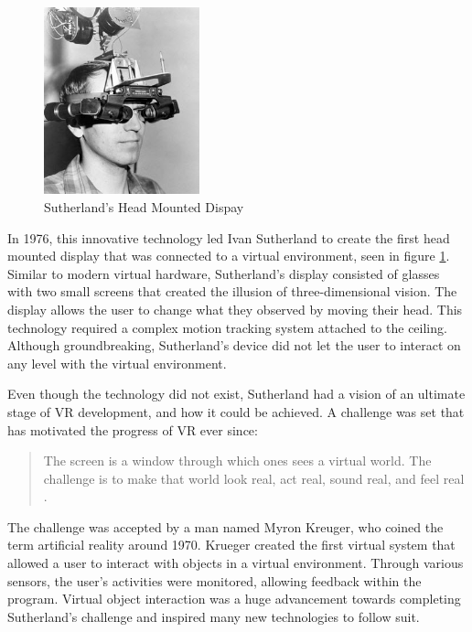 \documentclass[12pt]{article}
\begin{document}
   \begin{figure}[h]
         \centering
    \includegraphics[width=0.4\textwidth]{photo1_sutehrland}
    \caption{Sutherland's Head Mounted Dispay \cite{photo1_sutehrland}}
    \label{fig:sutherland_Display}
 \end{figure} 
 \par In 1976, this innovative technology led Ivan Sutherland to create the first head mounted display that was connected to a virtual environment, seen in figure \ref{fig:sutherland_Display}. Similar to modern virtual hardware, Sutherland's display consisted of glasses with two small screens that created the illusion of three-dimensional vision. The display allows the user to change what they observed by moving their head. This technology required a complex motion tracking system attached to the ceiling. Although groundbreaking, Sutherland's device did not let the user to interact on any level with the virtual environment.

  \par Even though the technology did not exist, Sutherland had a vision of an ultimate stage of VR development, and how it could be achieved. A challenge was set that has motivated the progress of VR ever since: 
  
 \begin{quote}
The screen is a window through which ones sees a virtual world. The challenge is to make that world look real, act real, sound real, and feel real  \cite{gobbetti}. 
\end{quote}

The challenge was accepted by a man named Myron Kreuger, who coined the term artificial reality around 1970. Krueger created the first virtual system that allowed a user to interact with objects in a virtual environment. Through various sensors, the user's activities were monitored, allowing feedback within the program. Virtual object interaction was a huge advancement towards completing Sutherland's challenge and inspired many new technologies to follow suit.  
\end{document}
